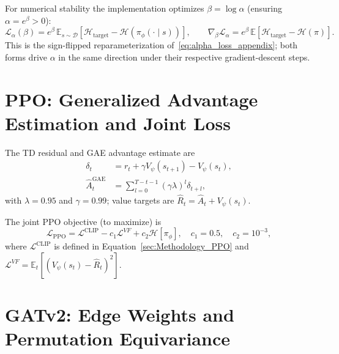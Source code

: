 For numerical stability the implementation optimizes $\beta = \log\alpha$ (ensuring $\alpha=e^\beta>0$):
\begin{equation}
  \mathcal{L}_\alpha(\beta)
  = e^\beta\,\mathbb{E}_{s\sim\mathcal{D}}\!\left[
    \mathcal{H}_{\mathrm{target}} - \mathcal{H}(\pi_\phi(\cdot\mid s))\right],
  \qquad
  \nabla_\beta\mathcal{L}_\alpha
  = e^\beta\,\mathbb{E}\!\left[\mathcal{H}_{\mathrm{target}} - \mathcal{H}(\pi)\right].
\end{equation}
This is the sign-flipped reparameterization of~\eqref{eq:alpha_loss_appendix}; both forms drive $\alpha$ in the same direction under their respective gradient-descent steps.

\section{PPO: Generalized Advantage Estimation and Joint Loss}
\label{sec:Appendix_PPO}

The TD residual and GAE advantage estimate are
\begin{align}
  \delta_t &= r_t + \gamma V_\psi(s_{t+1}) - V_\psi(s_t), \label{eq:td_residual} \\
  \hat{A}_t^{\mathrm{GAE}} &= \sum_{l=0}^{T-t-1}(\gamma\lambda)^l\delta_{t+l},
  \label{eq:gae}
\end{align}
with $\lambda=0.95$ and $\gamma=0.99$; value targets are $\hat{R}_t = \hat{A}_t + V_\psi(s_t)$.

The joint PPO objective (to maximize) is
\begin{equation}
  \mathcal{L}_{\mathrm{PPO}} = \mathcal{L}^{\mathrm{CLIP}} - c_1\mathcal{L}^{VF} + c_2\mathcal{H}[\pi_\phi],
  \quad c_1=0.5,\quad c_2=10^{-3},
  \label{eq:ppo_joint}
\end{equation}
where $\mathcal{L}^{\mathrm{CLIP}}$ is defined in Equation~\ref{sec:Methodology_PPO} and $\mathcal{L}^{VF} = \mathbb{E}_t[(V_\psi(s_t)-\hat{R}_t)^2]$.

\section{GATv2: Edge Weights and Permutation Equivariance}
\label{sec:Appendix_GATv2_properties}


